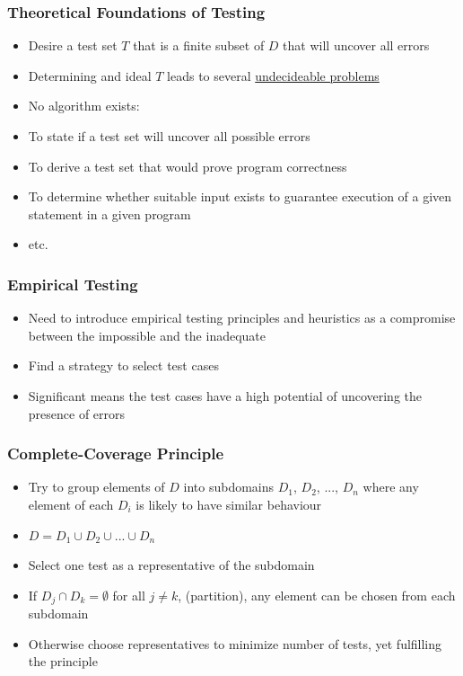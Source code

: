 \documentclass[t,12pt,numbers,fleqn]{beamer}
\begin{document}

\begin{frame}
\frametitle{Theoretical Foundations of Testing}

\begin{itemize}
\item Desire a test set $T$ that is a finite subset of $D$ that will uncover all errors
\item Determining and ideal $T$ leads to several
  \href{https://en.wikipedia.org/wiki/Undecidable_problem}{undecideable
    problems}
\item No algorithm exists:
\bi
\item To state if a test set will uncover all possible errors
\item To derive a test set that would prove program correctness
\item To determine whether suitable input exists to guarantee execution of a
  given statement in a given program
\item etc.
\ei
\end{itemize}

\end{frame}


\begin{frame}
\frametitle{Empirical Testing}

\begin{itemize}
\item Need to introduce empirical testing principles and heuristics as a
  compromise between the impossible and the inadequate
\item Find a strategy to select  test cases
\item Significant means the test cases have a high potential of uncovering the
  presence of errors
\end{itemize}

\end{frame}


\begin{frame}
\frametitle{Complete-Coverage Principle}

\begin{itemize}
\item Try to group elements of $D$ into subdomains $D_1$, $D_2$, ..., $D_n$
  where any element of each $D_i$ is likely to have similar behaviour
\item $D = D_1 \cup D_2 \cup ... \cup D_n$
\item Select one test as a representative of the subdomain
\item If $D_j \cap D_k = \emptyset$ for all $j \neq k$, (partition), any element
  can be chosen from each subdomain
\item Otherwise choose representatives to minimize number of tests, yet
  fulfilling the principle
\end{itemize}

\end{frame}
\end{document}
